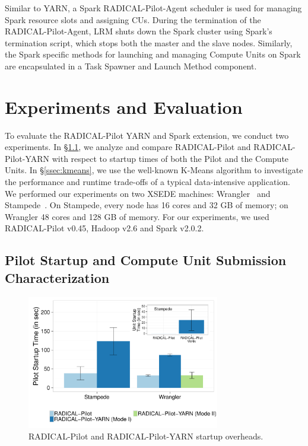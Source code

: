 Similar to YARN, a Spark RADICAL-Pilot-Agent scheduler is used
for managing Spark resource slots and assigning CUs. During the termination of
the RADICAL-Pilot-Agent, LRM shuts down the Spark cluster using
Spark’s termination script, which stops both the master and the slave nodes.
Similarly, the Spark specific methods for launching and managing Compute Units
on Spark are encapsulated in a Task Spawner and Launch Method component.

\section{Experiments and Evaluation}
\label{sec:rph-exps}

To evaluate the RADICAL-Pilot YARN and Spark extension, we conduct two
experiments. In \S\ref{ssec:startup_pilot_unit}, we analyze and compare
RADICAL-Pilot and RADICAL-Pilot-YARN with respect to startup times of both the
Pilot and the Compute Units. In \S\ref{ssec:kmeans}, we use the well-known
K-Means algorithm to investigate the performance and runtime trade-offs of a
typical data-intensive application. We performed our experiments on two XSEDE
machines: Wrangler~\cite{wrangler} and Stampede~\cite{stampede}. On Stampede,
every node has 16 cores and 32 GB of memory; on Wrangler 48 cores and 128 GB of
memory. For our experiments, we used RADICAL-Pilot v0.45, Hadoop v2.6 and Spark
v2.0.2.

\subsection{Pilot Startup and Compute Unit Submission Characterization}
\label{ssec:startup_pilot_unit}

\begin{figure}[t]
    \centering
    \includegraphics[width=0.75\textwidth]{figures/data_analytics_hpc/hpc_hadoop/pilot_unit_startup.pdf}
    \caption{RADICAL-Pilot and RADICAL-Pilot-YARN startup overheads.
        \label{fig:startup_yarn}}
\end{figure}

